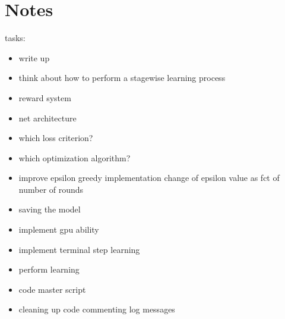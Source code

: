 \section{Notes}

tasks:
\begin{itemize}
\item write up
\item think about how to perform a stagewise learning process
\item reward system
\item net architecture
\item which loss criterion?
\item which optimization algorithm?
\item improve epsilon greedy implementation
\subitem change of epsilon value as fct of number of rounds
\item saving the model
\item implement gpu ability
\item implement terminal step learning
\item perform learning
\item code master script
\item cleaning up code
\subitem commenting
\subitem log messages
\end{itemize}